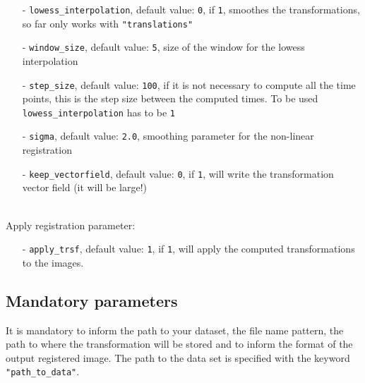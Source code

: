 \documentclass[10pt,a4paper]{article}
\begin{document}
\begin{itemize}
\item[-] \texttt{lowess\_interpolation}, default value: \texttt{0}, if \texttt{1}, smoothes the transformations, so far only works with \texttt{"translations"}
\item[-] \texttt{window\_size}, default value: \texttt{5}, size of the window for the lowess interpolation
\item[-] \texttt{step\_size}, default value: \texttt{100}, if it is not necessary to compute all the time points, this is the step size between the computed times. To be used \texttt{lowess\_interpolation} has to be \texttt{1}
\item[-] \texttt{sigma}, default value: \texttt{2.0}, smoothing parameter for the non-linear registration
\item[-] \texttt{keep\_vectorfield}, default value: \texttt{0}, if \texttt{1}, will write the transformation vector field (it will be large!)
\end{itemize}~\\
Apply registration parameter:
\begin{itemize}
\item[-] \texttt{apply\_trsf}, default value: \texttt{1}, if \texttt{1}, will apply the computed transformations to the images.
\end{itemize}
\subsection{Mandatory parameters}
It is mandatory to inform the path to your dataset, the file name pattern, the path to where the transformation will be stored and to inform the format of the output registered image. The path to the data set is specified with the keyword \texttt{"path\_to\_data"}.



\end{document}
